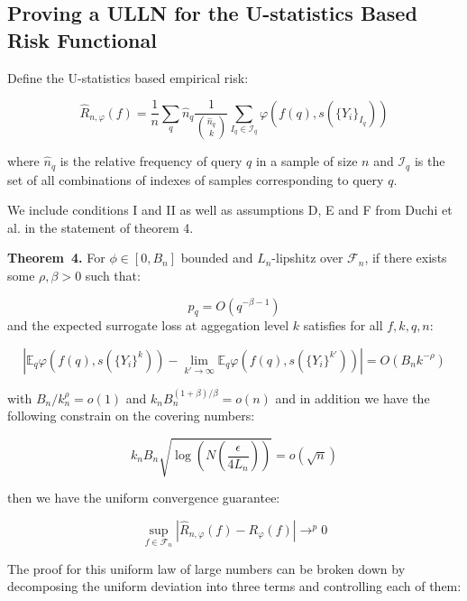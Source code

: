\documentclass[a4paper,10pt]{article}
\newenvironment{theorem}[1][]{\par\medskip
   \noindent \textbf{Theorem~#1.} \rmfamily}{\medskip}
\begin{document}
\subsection{Proving a ULLN for the U-statistics Based Risk Functional}

Define the U-statistics based empirical risk:

\begin{equation}
  \hat{R}_{n, \varphi}(f) = \frac{1}{n} \sum_q \hat{n}_q \frac{1}{\binom{\hat{n}_q}{k}} \sum_{I_q \in \mathcal{I}_q}\varphi(f(q), s(\{Y_i\}_{I_q}))
\end{equation}

where \(\hat{n}_q\) is the relative frequency of query \(q\) in a sample of size \(n\) and \(\mathcal{I}_q\) is the set of all combinations of indexes of samples corresponding to query \(q\).

We include conditions I and II as well as assumptions D, E and F from Duchi et al. \cite{duchi-2013-ranking} in the statement of theorem 4.
\begin{theorem}[4]
  For \(\phi \in [0, B_n]\) bounded and \(L_n\)-lipshitz over \(\mathcal{F}_n\),
  if there exists some \(\rho, \beta > 0\) such that:

  \begin{equation}
    p_q = O(q^{-\beta -1})
  \end{equation}
  and the expected surrogate loss at aggegation level \(k\) satisfies for all \(f, k, q, n\):

  \begin{equation}
    \left|\mathbb{E}_q\varphi(f(q), s(\{Y_i\}^k)) - \lim_{k' \rightarrow \infty}\mathbb{E}_q\varphi(f(q), s(\{Y_i\}^{k'}))\right| = O(B_nk^{-\rho})
  \end{equation}

  with \(B_n/k_n^\rho = o(1)\) and \(k_nB_n^{(1+\beta)/\beta}=o(n)\) and in addition we have the following constrain on the covering numbers:

  \begin{equation}
    k_nB_n\sqrt{\log\left( N(\frac{\epsilon}{4L_n}) \right)} = o(\sqrt n)
  \end{equation}

  then we have the uniform convergence guarantee:

  \begin{equation}
    \sup_{f \in \mathcal{F}_n}\left| \hat{R}_{n, \varphi}(f) - R_\varphi(f) \right| \rightarrow^p 0
  \end{equation}


\end{theorem}
The proof for this uniform law of large numbers can be broken down by decomposing the uniform deviation into three terms and controlling each of them:
\end{document}
